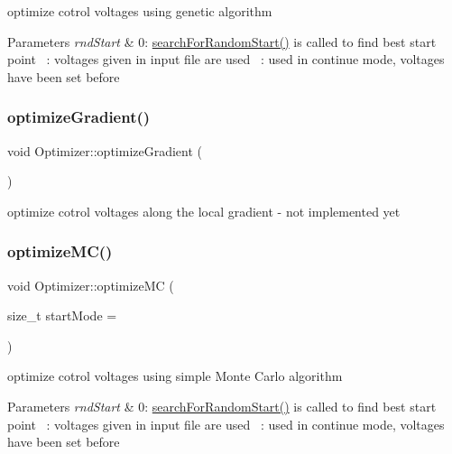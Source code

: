 optimize cotrol voltages using genetic algorithm 
\begin{DoxyParams}{Parameters}
{\em rnd\+Start} & 0\+: \hyperlink{classOptimizer_a5dfd9a3a649ffa7e064c49d00afdb384}{search\+For\+Random\+Start()} is called to find best start point ~\+: voltages given in input file are used ~\+: used in continue mode, voltages have been set before \\
\hline
\end{DoxyParams}
\mbox{\label{classOptimizer_a29a003cd019aa5908d1bb2bd317b1589}} 
\subsubsection{\texorpdfstring{optimize\+Gradient()}{optimizeGradient()}}
{\footnotesize\ttfamily void Optimizer\+::optimize\+Gradient (\begin{DoxyParamCaption}{ }\end{DoxyParamCaption})\hspace{0.3cm}{\ttfamily [private]}}

optimize cotrol voltages along the local gradient -\/ not implemented yet \mbox{\label{classOptimizer_a70cfb2468659d3d06d2fb7ba959c1f67}} 
\subsubsection{\texorpdfstring{optimize\+M\+C()}{optimizeMC()}}
{\footnotesize\ttfamily void Optimizer\+::optimize\+MC (\begin{DoxyParamCaption}\item[{size\+\_\+t}]{start\+Mode = {} }\end{DoxyParamCaption})\hspace{0.3cm}{\ttfamily [private]}}

optimize cotrol voltages using simple Monte Carlo algorithm 
\begin{DoxyParams}{Parameters}
{\em rnd\+Start} & 0\+: \hyperlink{classOptimizer_a5dfd9a3a649ffa7e064c49d00afdb384}{search\+For\+Random\+Start()} is called to find best start point ~\+: voltages given in input file are used ~\+: used in continue mode, voltages have been set before \\
\hline
\end{DoxyParams}
\mbox{\label{classOptimizer_aa9fdb7cd911fdd9fbfaf3fc8d86ea408}} 
